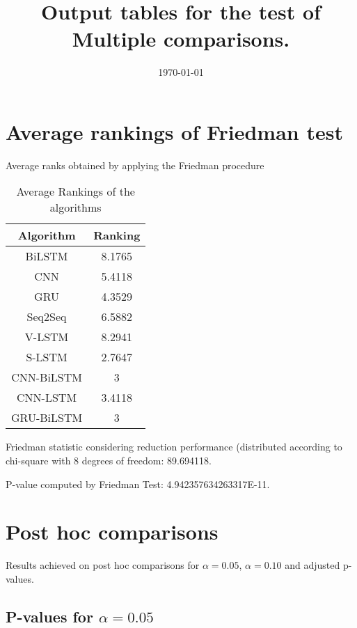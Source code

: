 \documentclass[a4paper,10pt]{article}
\title{Output tables for the test of Multiple comparisons.}
\author{}
\date{\today}
\begin{document}
\begin{landscape}
\pagestyle{empty}
\maketitle
\thispagestyle{empty}
\section{Average rankings of Friedman test}



Average ranks obtained by applying the Friedman procedure

\begin{table}[!htp]
\centering
\begin{tabular}{|c|c|}\hline
Algorithm&Ranking\\\hline
BiLSTM & 8.1765\\
CNN & 5.4118\\
GRU & 4.3529\\
Seq2Seq & 6.5882\\
V-LSTM & 8.2941\\
S-LSTM & 2.7647\\
CNN-BiLSTM & 3\\
CNN-LSTM & 3.4118\\
GRU-BiLSTM & 3\\
\hline
\end{tabular}
\caption{Average Rankings of the algorithms}
\end{table}

Friedman statistic considering reduction performance (distributed according to chi-square with 8 degrees of freedom: 89.694118.

P-value computed by Friedman Test: 4.942357634263317E-11.\newline



\pagebreak

\section{Post hoc comparisons}

Results achieved on post hoc comparisons for $\alpha = 0.05$, $\alpha = 0.10$ and adjusted p-values.

\subsection{P-values for $\alpha=0.05$}


\end{landscape}
\end{document}
